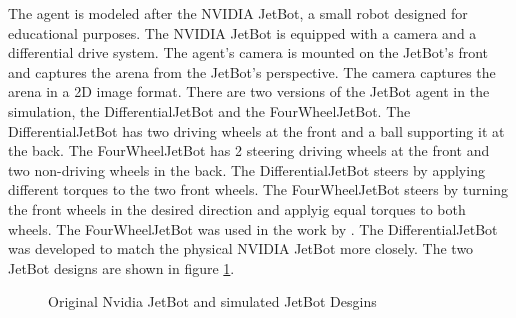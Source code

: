 The agent is modeled after the NVIDIA JetBot, a small robot designed for educational purposes. The NVIDIA JetBot is equipped with a camera and a differential drive system. The agent's camera is mounted on the JetBot's front and captures the arena from the JetBot's perspective. The camera captures the arena in a 2D image format. 
There are two versions of the JetBot agent in the simulation, the DifferentialJetBot and the FourWheelJetBot. The DifferentialJetBot has two driving wheels at the front and a ball supporting it at the back. The FourWheelJetBot has 2 steering driving wheels at the front and two non-driving wheels in the back. The DifferentialJetBot steers by applying different torques to the two front wheels. The FourWheelJetBot steers by turning the front wheels in the desired direction and applyig equal torques to both wheels.
The FourWheelJetBot was used in the work by \autocite{maximilian}. The DifferentialJetBot was developed to match the physical NVIDIA JetBot more closely. The two JetBot designs are shown in figure \ref{fig:jetbots}.

\begin{figure}
    \centering
    \qquad
    \qquad
    \qquad
    \caption{Original Nvidia JetBot and simulated JetBot Desgins}
    \label{fig:jetbots}
\end{figure}


